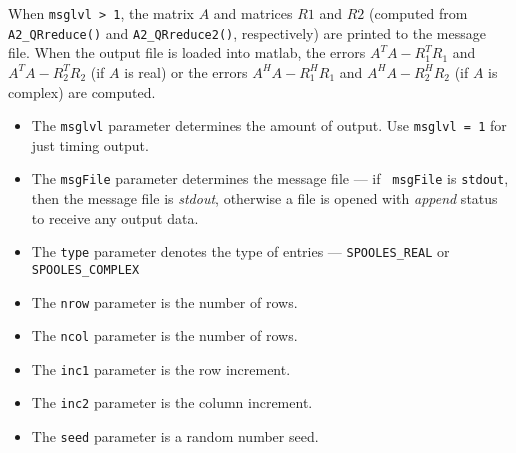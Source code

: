 \begin{enumerate}
When {\tt msglvl > 1}, the matrix $A$ and matrices $R1$ and $R2$
(computed from {\tt A2\_QRreduce()} and
{\tt A2\_QRreduce2()}, respectively)
are printed to the message file.
When the output file is loaded into matlab,
the errors $A^TA - R_1^TR_1$ and $A^TA - R_2^TR_2$
(if $A$ is real) 
or
the errors $A^HA - R_1^HR_1$ and $A^HA - R_2^HR_2$
(if $A$ is complex) are computed.
\par
\begin{itemize}
\item
The {\tt msglvl} parameter determines the amount of output.
Use {\tt msglvl = 1} for just timing output.
\item
The {\tt msgFile} parameter determines the message file --- if {\tt
msgFile} is {\tt stdout}, then the message file is {\it stdout},
otherwise a file is opened with {\it append} status to receive any
output data.
\item
The {\tt type} parameter denotes the type of entries ---
{\tt SPOOLES\_REAL} or {\tt SPOOLES\_COMPLEX} 
\item
The {\tt nrow} parameter is the number of rows.
\item
The {\tt ncol} parameter is the number of rows.
\item
The {\tt inc1} parameter is the row increment.
\item
The {\tt inc2} parameter is the column increment.
\item
The {\tt seed} parameter is a random number seed.
\end{itemize}
\end{enumerate}
